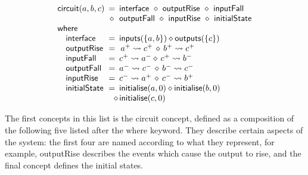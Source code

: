 \documentclass[british, journal]{IEEEtran}
\begin{document}
\vspace{-3mm}
\[
\begin{array}{lcl}
\mathsf{circuit}(a,b,c)&\hspace{-2mm}=&\hspace{-2mm}\mathsf{interface}~\diamond~\mathsf{outputRise}~\diamond~\mathsf{inputFall}\\
~&\hspace{-2mm}\diamond&\hspace{-2mm}\mathsf{outputFall}~\diamond~\mathsf{inputRise}~\diamond~\mathsf{initialState}\\
\mathsf{where}&~&\\
\,\,\,\,\,\,\mathsf{interface}&\hspace{-2mm}=&\hspace{-2mm}\mathsf{inputs}(\{a,b\})\diamond\mathsf{outputs}(\{c\})\\
\,\,\,\,\,\,\mathsf{outputRise}&\hspace{-2mm}=&\hspace{-2mm}\,a^{+}\rightsquigarrow c^{+}\,\diamond\, b^{+}\rightsquigarrow c^{+}\\
\,\,\,\,\,\,\mathsf{inputFall}&\hspace{-2mm}=&\hspace{-2mm}c ^ {+} \rightsquigarrow a^{-} \diamond\, c ^ {+} \rightsquigarrow b^{-}\\
\,\,\,\,\,\,\mathsf{outputFall}&\hspace{-2mm}=&\hspace{-2mm}a^{-} \rightsquigarrow c^{-} \,\diamond\, b^{-} \rightsquigarrow c^{-}\\
\,\,\,\,\,\,\mathsf{inputRise}&\hspace{-2mm}=&\hspace{-2mm}c^{-} \rightsquigarrow a^{+} \,\diamond\, c^{-} \rightsquigarrow b^{+}\\
\,\,\,\,\,\,\mathsf{initialState}&\hspace{-2mm}=&\hspace{-2mm}\mathsf{initialise}(a,0) \diamond \mathsf{initialise}(b,0) \\
&~&\hspace{-4.3mm}\diamond \, \mathsf{initialise}(c,0)\\
\end{array}
\]

The first concepts in this list is the \textsf{circuit} concept, defined as a
composition of the following five listed after the \textsf{where} keyword.
They describe certain aspects of the system: the first four are named
according to what they represent, for example, \textsf{outputRise} describes
the events which cause the output to rise, and the final concept defines
the initial states.
\end{document}
